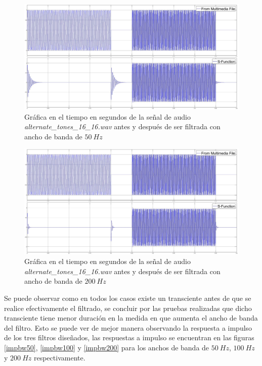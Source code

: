 \begin{enumerate}
\begin{figure}[H]
    \centering
    \includegraphics[scale = 0.2]{Figuras/p6_1- alternate_tones_bw50.jpg}
    \caption{Gráfica  en el tiempo en segundos de la señal de audio \textit{alternate\_tones\_16\_16.wav} antes y después de ser filtrada con ancho de banda de $50~Hz$}
    \label{bw50}
\end{figure}


\begin{figure}[H]
    \centering
    \includegraphics[scale = 0.2]{Figuras/p6_1- alternate_tones_bw200.jpg}
    \caption{Gráfica  en el tiempo en segundos de la señal de audio \textit{alternate\_tones\_16\_16.wav} antes y después de ser filtrada con ancho de banda de $200~Hz$}
    \label{bw200}
\end{figure}


Se puede observar como en todos los casos existe un transciente antes de que se realice efectivamente el filtrado, se concluir por las pruebas realizadas que dicho transciente tiene menor duración en la medida en que aumenta el ancho de banda del filtro. Esto se puede ver de mejor manera observando la respuesta a impulso de los tres filtros diseñados, las respuestas a impulso se encuentran en las figuras \ref{impbw50}, \ref{impbw100} y \ref{impbw200} para los anchos de banda de $50~Hz$, $100~Hz$ y $200~Hz$ respectivamente.


\end{enumerate}

